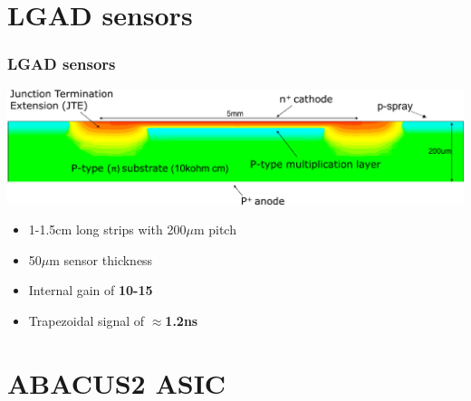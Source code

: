 \documentclass[aspectratio=169]{beamer}
\begin{document}
	\section{LGAD sensors}
	
	\begin{frame}
	\frametitle{LGAD sensors}
		\begin{center}
			\includegraphics[width=0.9 \textwidth]{IMG/LGAD_image.PNG}
		\end{center}
		\begin{itemize}
			\item 1-1.5cm long strips with 200$\mu$m pitch
			\item 50$\mu$m sensor thickness
			\item Internal gain of \textbf{10-15} 
			\item Trapezoidal signal of $\approx$\textbf{1.2ns}
		\end{itemize}
	\end{frame}

	\section{ABACUS2 ASIC}
	
\end{document}
